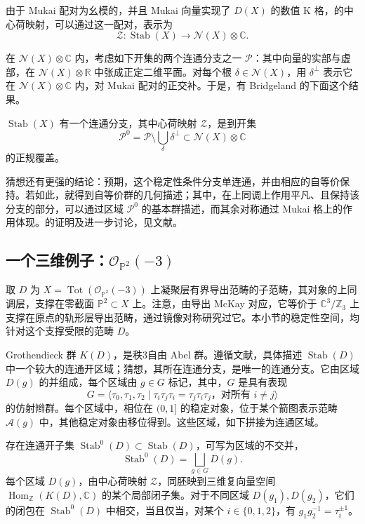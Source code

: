 由于 Mukai 配对为幺模的，并且 Mukai 向量实现了 $D(X)$ 的数值 K 格，的中心荷映射，可以通过这一配对，表示为
\[
\mathcal{Z}\colon\operatorname{Stab}(X)
\longrightarrow\mathcal{N}(X)\otimes\mathbb{C}.
\]

在 $\mathcal{N}(X)\otimes\mathbb{C}$ 内，考虑如下开集的两个连通分支之一 $\mathcal{P}$：其中向量的实部与虚部，在 $\mathcal{N}(X)\otimes\mathbb{R}$ 中张成正定二维平面。对每个根 $\delta\in\mathcal{N}(X)$，用 $\delta^\perp$ 表示它在 $\mathcal{N}(X)\otimes\mathbb{C}$ 内，对 Mukai 配对的正交补。于是，有 Bridgeland 的下面这个结果。
\begin{theorem}\label{thm:5.41}
$\operatorname{Stab}(X)$ 有一个连通分支，其中心荷映射 $\mathcal{Z}$，是到开集
\[
\mathcal{P}^0=\mathcal{P}\setminus\bigcup_\delta\delta^\perp
\subset\mathcal{N}(X)\otimes\mathbb{C}
\]
的正规覆盖。
\end{theorem}

猜想还有更强的结论：预期，这个稳定性条件分支单连通，并由相应的自等价保持。若如此，就得到自等价群的几何描述；其中，在上同调上作用平凡、且保持该分支的部分，可以通过区域 $\mathcal{P}^0$ 的基本群描述，而其余对称通过 Mukai 格上的作用体现。的证明及进一步讨论，见文献。

\subsection{一个三维例子：\texorpdfstring{$\mathcal{O}_{\mathbb{P}^2}(-3)$}{Oₚ²(−3)}}\label{sec:5.8.3}

取 $D$ 为 $X=\operatorname{Tot}(\mathcal{O}_{\mathbb{P}^2}(-3))$ 上凝聚层有界导出范畴的子范畴，其对象的上同调层，支撑在零截面 $\mathbb{P}^2\subset X$ 上。注意，由导出 McKay 对应，它等价于 $\mathbb{C}^3/\mathbb{Z}_3$ 上支撑在原点的轨形层导出范畴，通过镜像对称研究过它。本小节的稳定性空间，均针对这个支撑受限的范畴 $D$。

Grothendieck 群 $K(D)$，是秩3自由 Abel 群。遵循文献，具体描述 $\operatorname{Stab}(D)$ 中一个较大的连通开区域；猜想，其所在连通分支，是唯一的连通分支。它由区域 $D(g)$ 的并组成，每个区域由 $g\in G$ 标记，其中，$G$ 是具有表现
\[
G=\langle\tau_0,\tau_1,\tau_2\mid
\tau_i\tau_j\tau_i=\tau_j\tau_i\tau_j\text{，对所有 }i\ne j\rangle
\]
的仿射辫群。每个区域中，相位在 $(0,1]$ 的稳定对象，位于某个箭图表示范畴 $\mathcal{A}(g)$ 中，其他稳定对象由移位得到。这些区域，如下拼接为连通区域。
\begin{theorem}\label{thm:5.42}
存在连通开子集 $\operatorname{Stab}^0(D)\subset\operatorname{Stab}(D)$，可写为区域的不交并，
\[
\operatorname{Stab}^0(D)=\bigsqcup_{g\in G}D(g).
\]
每个区域 $D(g)$，由中心荷映射 $\mathcal{Z}$，同胚映到三维复向量空间 $\operatorname{Hom}_{\mathbb{Z}}(K(D),\mathbb{C})$ 的某个局部闭子集。对于不同区域 $D(g_1),D(g_2)$，它们的闭包在 $\operatorname{Stab}^0(D)$ 中相交，当且仅当，对某个 $i\in\{0,1,2\}$，有 $g_1g_2^{-1}=\tau_i^{\pm1}$。
\end{theorem}

